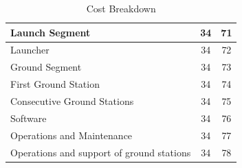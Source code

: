 \begin{table}[htbp]
\begin{tabular}{p{10cm} | c | c }
Launch Segment &         34 &         71 \\ \hline

  \hspace{1.0cm}Launcher &         34 &         72 \\ \hline

Ground Segment &         34 &         73 \\ \hline

\hspace{1.0cm}First Ground Station &         34 &         74 \\

\hspace{1.0cm}Consecutive Ground Stations &         34 &         75 \\

\hspace{1.0cm}Software &         34 &         76 \\ \hline

Operations and Maintenance &         34 &         77 \\ \hline

\hspace{1.0cm}Operations and support of ground stations &         34 &         78 \\
	
\end{tabular} 
\caption{Cost Breakdown}
	\label{tab:CostBreakdown} 
\end{table}



